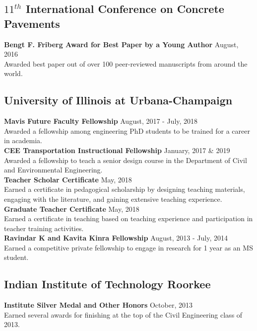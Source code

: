 \documentclass[12pt]{article}
\begin{document}
\subsection*{$11^{th}$ International Conference on Concrete Pavements}
\textbf{Bengt F. Friberg Award for Best Paper by a Young Author} \hfill August, 2016  \\
Awarded best paper out of over 100 peer-reviewed manuscripts from around the world. \\

\subsection*{University of Illinois at Urbana-Champaign} 
\textbf{Mavis Future Faculty Fellowship} \hfill August, 2017 - July, 2018 \\
Awarded a fellowship among engineering PhD students to be trained for a career in academia. \\

\textbf{CEE Transportation Instructional Fellowship} \hfill January, 2017 \& 2019 \\
Awarded a fellowship to teach a senior design course in the Department of Civil and Environmental Engineering. \\

\textbf{Teacher Scholar Certificate} \hfill May, 2018 \\
Earned a certificate in pedagogical scholarship by designing teaching materials, engaging with the literature, and gaining extensive teaching experience. \\

\textbf{Graduate Teacher Certificate} \hfill May, 2018 \\
Earned a certificate in teaching based on teaching experience and participation in teacher training activities. \\

\textbf{Ravindar K and Kavita Kinra Fellowship} \hfill August, 2013 - July, 2014 \\
Earned a competitive private fellowship to engage in research for 1 year as an MS student. \\

\subsection*{Indian Institute of Technology Roorkee} 
\textbf{Institute Silver Medal and Other Honors} \hfill October, 2013 \\
Earned several awards for finishing at the top of the Civil Engineering class of 2013. \\
\end{document}

